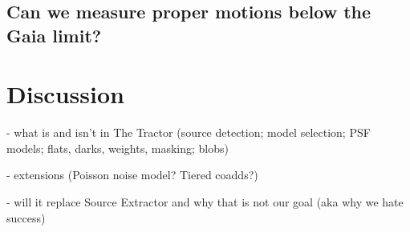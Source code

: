\documentclass[modern, linenumbers]{aastex631}
\begin{document}
\subsection{Can we measure proper motions below the Gaia limit?}



\section{Discussion}

- what is and isn't in The Tractor (source detection; model selection; PSF models; flats, darks, weights, masking; blobs)

- extensions (Poisson noise model?  Tiered coadds?)

- will it replace Source Extractor and why that is not our goal (aka why we hate success)



\software{%
          }


{}

\end{document}
